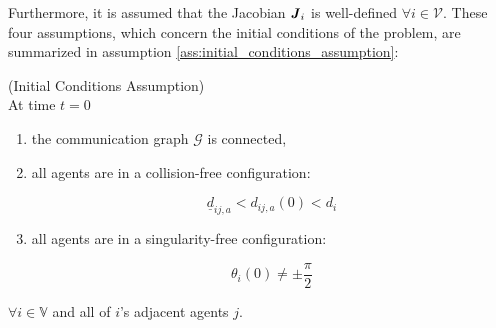 Furthermore, it is assumed that the Jacobian $\bm{\mathit{J}}_i$ is well-defined
$\forall i \in \mathcal{V}$. These four assumptions, which concern the initial
conditions of the problem, are summarized in assumption
\ref{ass:initial_conditions_assumption}:

\begin{gg_box}
\begin{assumption}(Initial Conditions Assumption)\\

  At time $t = 0$

  \begin{enumerate}

	  \item the communication graph $\mathcal{G}$ is connected,

    \item all agents are in a collision-free configuration:

      $$\underline{d}_{ij,a} < d_{ij,a}(0) < d_i$$

    \item all agents are in a singularity-free configuration:

      $$\theta_i(0) \neq \pm \frac{\pi}{2}$$

  \end{enumerate}
  $\forall i \in \mathbb{V}$ and all of $i$'s adjacent agents $j$.
  \label{ass:initial_conditions_assumption}
\end{assumption}
\end{gg_box}





